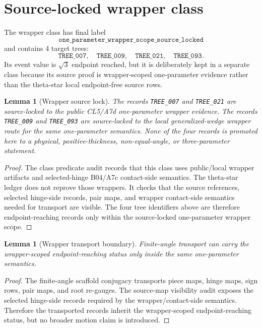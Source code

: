 \documentclass[11pt,a4paper]{article}
\newtheorem{lemma}[theorem]{Lemma}
\theoremstyle{definition}
\theoremstyle{remark}
\begin{document}

\section{Source-locked wrapper class}

The wrapper class has final label
\[
  \texttt{one\_parameter\_wrapper\_scope\_source\_locked}
\]
and contains 4 target trees:
\[
  \texttt{TREE\_007},\quad \texttt{TREE\_009},\quad
  \texttt{TREE\_021},\quad \texttt{TREE\_093}.
\]
Its event value is \(\sqrt{3}\) endpoint reached, but it is deliberately kept in a separate class because its source proof is wrapper-scoped one-parameter evidence rather than the theta-star local endpoint-free source rows.

\begin{lemma}[Wrapper source lock]
The records \texttt{TREE\_007} and \texttt{TREE\_021} are source-locked to the public CL5/A7d one-parameter wrapper evidence.  The records \texttt{TREE\_009} and \texttt{TREE\_093} are source-locked to the local generalized-wedge wrapper route for the same one-parameter semantics.  None of the four records is promoted here to a physical, positive-thickness, non-equal-angle, or three-parameter statement.
\end{lemma}

\begin{proof}
The class predicate audit records that this class uses public/local wrapper artifacts and selected-hinge B04/A7c contact-side semantics.  The theta-star ledger does not reprove those wrappers.  It checks that the source references, selected hinge-side records, pair maps, and wrapper contact-side semantics needed for transport are visible.  The four tree identifiers above are therefore endpoint-reaching records only within the source-locked one-parameter wrapper scope.
\end{proof}

\begin{lemma}[Wrapper transport boundary]
Finite-angle transport can carry the wrapper-scoped endpoint-reaching status only inside the same one-parameter semantics.
\end{lemma}

\begin{proof}
The finite-angle scaffold conjugacy transports piece maps, hinge maps, sign rows, pair maps, and root re-gauges.  The source-map visibility audit exposes the selected hinge-side records required by the wrapper/contact-side semantics.  Therefore the transported records inherit the wrapper-scoped endpoint-reaching status, but no broader motion claim is introduced.
\end{proof}
\end{document}
